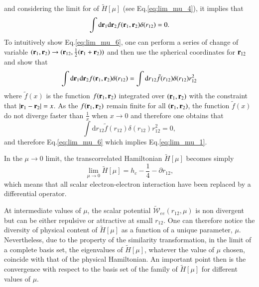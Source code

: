 \documentclass[aip,jcp,reprint,noshowkeys,superscriptaddress]{revtex4-1}
\newcommand{\br}[0]{{\bf {r}}}
\begin{document}
and considering the limit for of $\tilde{H}[\mu]$ (see Eq.\eqref{eq:lim_mu_4}), it implies that 
\begin{equation}
 \label{eq:lim_mu_6}
 \int \text{d}\br{}_1 \text{d}\br{}_2 f(\br{}_1,\br{}_2) \delta(r_{12}) = 0.
\end{equation}
To intuitively show Eq.\eqref{eq:lim_mu_6}, one can perform a series of change of variable $(\br{}_1,\br{}_2)\rightarrow (\br{}_{12},\frac{1}{2}(\br{}_1 + \br{}_2))$ and then use the spherical coordinates for $\br{}_{12}$ and show that 
\begin{equation}
 \int \text{d}\br{}_1 \text{d}\br{}_2 f(\br{}_1,\br{}_2) \delta(r_{12}) = \int \text{d}r{}_{12}  \tilde{f}(r_{12}) \delta(r_{12}) r_{12}^2 
\end{equation}
where $\tilde{f}(x)$ is the function $f(\br{}_1,\br{}_2)$ integrated over $(\br{}_1,\br{}_2)$ with the constraint that 
$|\br{}_1-\br{}_2| = x$. 
As the $f(\br{}_1,\br{}_2)$ remain finite for all $(\br{}_1,\br{}_2)$, the function $\tilde{f}(x)$ 
do not diverge faster than $\frac{1}{x}$ when $x\rightarrow 0$ and therefore one obtains that 
\begin{equation}
 \int \text{d}r{}_{12}  \tilde{f}(r_{12}) \delta(r_{12}) r_{12}^2 = 0,
\end{equation}
and therefore Eq.\eqref{eq:lim_mu_6} which implies Eq.\eqref{eq:lim_mu_1}. 

In the $\mu \rightarrow 0$ limit, the transcorrelated Hamiltonian $\tilde{H}[\mu]$ becomes simply 
\begin{equation}
 \lim_{\mu \rightarrow 0} \tilde{H}[\mu] = h_c - \frac{1}{4} - \partial{}{r_{12}}{}, 
\end{equation}
which means that all scalar electron-electron interaction have been replaced by a differential operator. 

At intermediate values of $\mu$, the scalar potential $\tilde{\mathcal{W}}_{ee}(r_{12},\mu) $ is non divergent but can be either repulsive or attractive at small $r_{12}$. One can therefore notice the diversity of physical content of $\tilde{H}[\mu]$ as a function of a unique parameter, $\mu$. 
Nevertheless, due to the property of the similarity transformation, in the limit of a complete basis set, the eigenvalues of $\tilde{H}[\mu]$, whatever the value of $\mu$ chosen, coincide with that of the physical Hamiltonian. An important point then is the convergence with respect to the basis set of the family of $\tilde{H}[\mu]$ for different values of $\mu$.  
\end{document}
